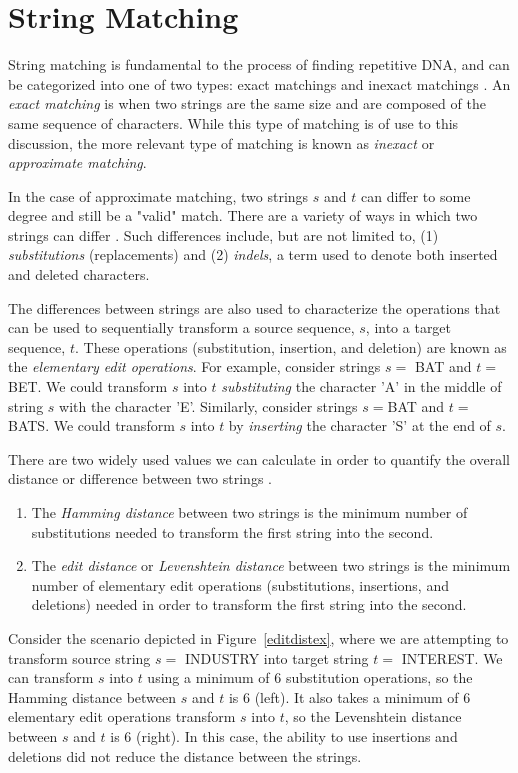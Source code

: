 \section{String Matching}
String matching is fundamental to the process of finding repetitive DNA, and can be categorized into one of two types: exact matchings and inexact matchings \cite{gusfield1997algorithms}. An \textit{exact matching} is when two strings are the same size and are composed of the same sequence of characters. While this type of matching is of use to this discussion, the more relevant type of matching is known as \textit{inexact} or \textit{approximate matching}. 

In the case of approximate matching, two strings $s$ and $t$ can differ to some degree and still be a "valid" match. There are a variety of ways in which two strings can differ \cite{kruskal1983an-overview}. Such differences include, but are not limited to, (1) \textit{substitutions} (replacements) and (2) \textit{indels}, a term used to denote both inserted and deleted characters. 

The differences between strings are also used to characterize the operations that can be used to sequentially transform a source sequence, $s$, into a target sequence, $t$. These operations (substitution, insertion, and deletion) are known as the \textit{elementary edit operations}. For example, consider strings $s=$ BAT and $t=$ BET. We could transform $s$ into $t$ \textit{substituting} the character 'A' in the middle of string $s$ with the character 'E'. Similarly, consider strings $s=$BAT and $t=$BATS. We could transform $s$ into $t$ by \textit{inserting} the character 'S' at the end of $s$.

 There are two widely used values we can calculate in order to quantify the overall distance or difference between two strings \cite{kruskal1983an-overview}. 
 \begin{enumerate}
 \item{The \textit{Hamming distance} between two strings is the minimum number of substitutions needed to transform the first string into the second.}
 \item{The \textit{edit distance} or \textit{Levenshtein distance} \cite{levenshtein1966binary} between two strings is the minimum number of elementary edit operations (substitutions, insertions, and deletions) needed in order to transform the first string into the second.}
 \end{enumerate}
Consider the scenario depicted in Figure~\ref{editdistex}, where we are attempting to transform source string $s=$ INDUSTRY into target string $t=$ INTEREST. We can transform $s$ into $t$ using a minimum of 6 substitution operations, so the Hamming distance between $s$ and $t$ is 6 (left). It also takes a minimum of 6 elementary edit operations  transform $s$ into $t$, so the Levenshtein distance between $s$ and $t$ is 6 (right). In this case, the ability to use insertions and deletions did not reduce the distance between the strings.

